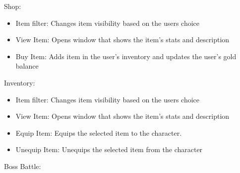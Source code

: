 \documentclass[12pt]{report}
\renewcommand{\_}{\kern-1.5pt\textunderscore\kern-1.5pt}
\begin{document}
\vspace{\baselineskip}
Shop: \par

\begin{itemize}
	\item Item filter: Changes item visibility based on the users choice\par

	\item View Item: Opens window that shows the item’s stats and description\par

	\item Buy Item: Adds item in the user’s inventory and updates the user’s gold balance
\end{itemize}\par


\vspace{\baselineskip}
Inventory:\par

\begin{itemize}
	\item Item filter: Changes item visibility based on the users choice\par

	\item View Item: Opens window that shows the item’s stats and description\par

	\item Equip Item: Equips the selected item to the character.\par

	\item Unequip Item: Unequips the selected item from the character
\end{itemize}\par


Boss Battle: \par
\end{document}
